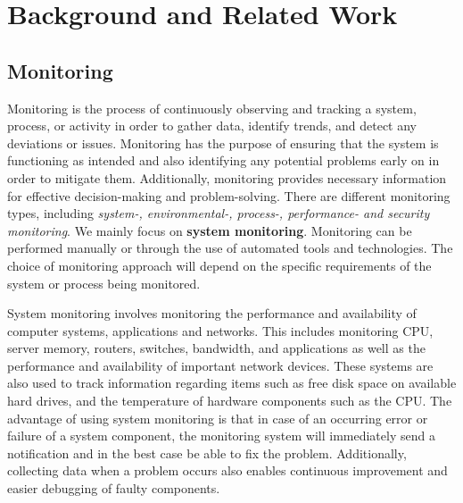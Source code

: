 \chapter{Background and Related Work}
\label{ch:background}

    \section{Monitoring}
    \label{sec:monitoring-background}

        Monitoring is the process of continuously observing and tracking a system, process, or activity in order to gather data, identify trends, and detect any deviations or issues.
        Monitoring has the purpose of ensuring that the system is functioning as intended and also identifying any potential problems early on in order to mitigate them. Additionally, monitoring provides necessary information for effective decision-making and problem-solving.
        There are different monitoring types, including \emph{system-, environmental-, process-, performance- and security monitoring}.
        We mainly focus on \textbf{system monitoring}.
        Monitoring can be performed manually or through the use of automated tools and technologies.
        The choice of monitoring approach will depend on the specific requirements of the system or process being monitored.

        System monitoring involves monitoring the performance and availability of computer systems, applications and networks.
        This includes monitoring CPU, server memory, routers, switches, bandwidth, and applications as well as the performance and availability of important network devices. 
        These systems are also used to track information regarding items such as free disk space on available hard drives, and the temperature of hardware components such as the CPU.
        The advantage of using system monitoring is that in case of an occurring error or failure of a system component, the monitoring system will immediately send a notification and in the best case be able to fix the problem.
        Additionally, collecting data when a problem occurs also enables continuous improvement and easier debugging of faulty components.




